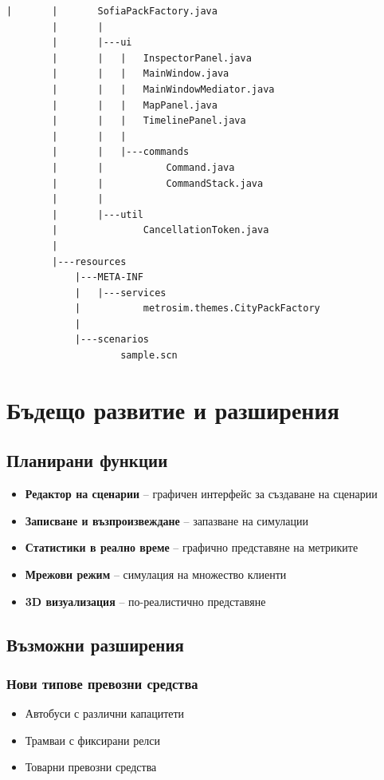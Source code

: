 \documentclass{article}
\begin{document}
\begin{lstlisting}[caption=Структура на директориите]
        |       |       SofiaPackFactory.java
        |       |
        |       |---ui
        |       |   |   InspectorPanel.java
        |       |   |   MainWindow.java
        |       |   |   MainWindowMediator.java
        |       |   |   MapPanel.java
        |       |   |   TimelinePanel.java
        |       |   |
        |       |   |---commands
        |       |           Command.java
        |       |           CommandStack.java
        |       |
        |       |---util
        |               CancellationToken.java
        |
        |---resources
            |---META-INF
            |   |---services
            |           metrosim.themes.CityPackFactory
            |
            |---scenarios
                    sample.scn
\end{lstlisting}

\section{Бъдещо развитие и разширения}

\subsection{Планирани функции}

\begin{itemize}
	\item \textbf{Редактор на сценарии} – графичен интерфейс за създаване на сценарии
	\item \textbf{Записване и възпроизвеждане} – запазване на симулации
	\item \textbf{Статистики в реално време} – графично представяне на метриките
	\item \textbf{Мрежови режим} – симулация на множество клиенти
	\item \textbf{3D визуализация} – по-реалистично представяне
\end{itemize}

\subsection{Възможни разширения}

\subsubsection{Нови типове превозни средства}
\begin{itemize}
	\item Автобуси с различни капацитети
	\item Трамваи с фиксирани релси
	\item Товарни превозни средства
\end{itemize}
\end{document}
